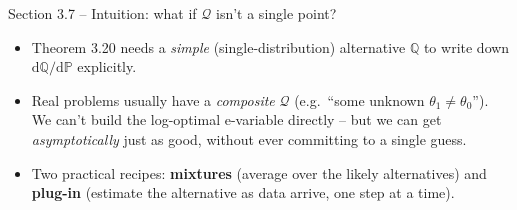 \documentclass[aspectratio=169,10pt]{beamer}
\newcommand{\PP}{\mathbb{P}}
\newcommand{\QQ}{\mathbb{Q}}
\newcommand{\calQ}{\mathcal{Q}}
\begin{document}
\begin{frame}{Section 3.7 -- Intuition: what if $\calQ$ isn't a single point?}
  \begin{itemize}
    \item Theorem 3.20 needs a \emph{simple} (single-distribution) alternative $\QQ$ to write down $\mathrm{d}\QQ/\mathrm{d}\PP$ explicitly.
    \item Real problems usually have a \emph{composite} $\calQ$ (e.g.\ ``some unknown $\theta_1\ne\theta_0$''). We can't build the log-optimal e-variable directly -- but we can get \emph{asymptotically} just as good, without ever committing to a single guess.
    \item Two practical recipes: \textbf{mixtures} (average over the likely alternatives) and \textbf{plug-in} (estimate the alternative as data arrive, one step at a time).
  \end{itemize}
\end{frame}
\end{document}
